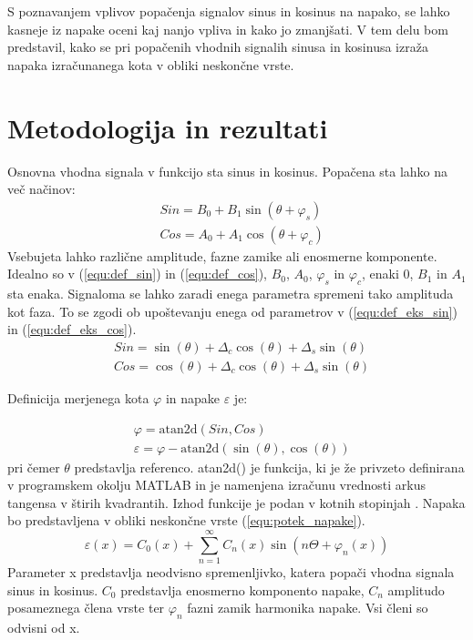\documentclass[a4paper]{article}
\begin{document}
S poznavanjem vplivov popačenja signalov sinus in kosinus na napako, se lahko kasneje iz napake oceni kaj nanjo vpliva in kako jo zmanjšati.
V tem delu bom predstavil, kako se pri popačenih vhodnih signalih sinusa in kosinusa  izraža napaka izračunanega kota v obliki neskončne vrste.


\section{Metodologija in rezultati}

Osnovna vhodna signala v funkcijo sta sinus in kosinus. Popačena sta lahko na več načinov:
\begin{eqnarray}
\label{equ:def_sin}
&Sin = B_{0} + B_1 \sin(\theta + \varphi_{s})\\
\label{equ:def_cos}
&Cos = A_{0} + A_1 \cos(\theta + \varphi_{c})
\end{eqnarray}
Vsebujeta lahko različne amplitude, fazne zamike ali enosmerne komponente. Idealno so v (\ref{equ:def_sin}) in (\ref{equ:def_cos}), $B_0$, $A_0$, $\varphi_{s}$ in $\varphi_{c}$, enaki 0, $B_1$ in $A_1$ sta enaka. Signaloma se lahko zaradi enega parametra spremeni tako amplituda kot faza. To se zgodi ob upoštevanju enega od parametrov v (\ref{equ:def_eks_sin}) in (\ref{equ:def_eks_cos}).
\begin{eqnarray}
\label{equ:def_eks_sin}
&Sin = \sin(\theta)+\Delta_c \cos(\theta)+\Delta_s \sin(\theta)\\
\label{equ:def_eks_cos}
&Cos =\cos(\theta)+\Delta_c \cos(\theta)+\Delta_s \sin(\theta)
\end{eqnarray}

Definicija merjenega kota $\varphi$ in  napake $\varepsilon$ je:

\begin{eqnarray}
\label{equ:def_kot}
&\varphi = \mathrm{atan2d}(Sin,Cos)\\
\label{equ:def_err}
&\varepsilon =\varphi - \mathrm{atan2d}(\sin(\theta),\cos(\theta))
\end{eqnarray}
pri čemer $\theta$ predstavlja referenco. atan2d() je funkcija, ki je že privzeto definirana v programskem okolju MATLAB in je namenjena izračunu vrednosti arkus tangensa v štirih kvadrantih. Izhod funkcije je podan v kotnih stopinjah \cite{atand}.
Napaka bo predstavljena v obliki neskončne vrste (\ref{equ:potek_napake}).
\begin{equation}
\label{equ:potek_napake}
\varepsilon(x) = C_0(x) + \sum_{n=1}^{\infty} C_n(x) \sin(n \Theta+ \varphi_n(x))
\end{equation}
Parameter x predstavlja neodvisno spremenljivko, katera popači vhodna signala sinus in kosinus. $C_0$ predstavlja enosmerno komponento napake, $C_n$ amplitudo posameznega člena vrste ter $\varphi_n$ fazni zamik harmonika napake. Vsi členi so odvisni od x.
\end{document}
